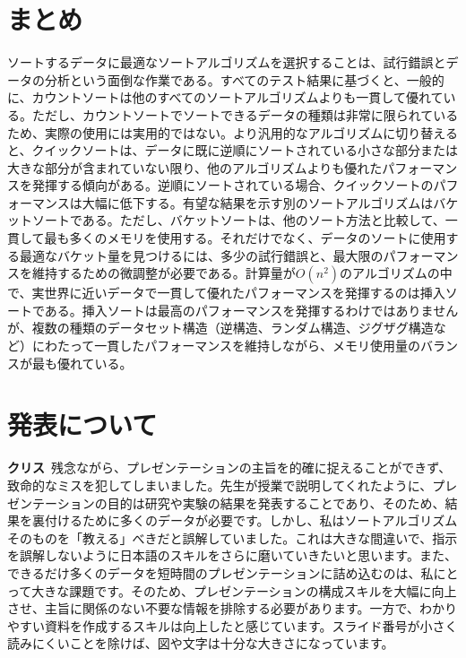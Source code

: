 \documentclass[a4j, 11pt]{jarticle}
\begin{document}
\section{まとめ}
ソートするデータに最適なソートアルゴリズムを選択することは、試行錯誤とデータの分析という面倒な作業である。すべてのテスト結果に基づくと、一般的に、カウントソートは他のすべてのソートアルゴリズムよりも一貫して優れている。ただし、カウントソートでソートできるデータの種類は非常に限られているため、実際の使用には実用的ではない。より汎用的なアルゴリズムに切り替えると、クイックソートは、データに既に逆順にソートされている小さな部分または大きな部分が含まれていない限り、他のアルゴリズムよりも優れたパフォーマンスを発揮する傾向がある。逆順にソートされている場合、クイックソートのパフォーマンスは大幅に低下する。有望な結果を示す別のソートアルゴリズムはバケットソートである。ただし、バケットソートは、他のソート方法と比較して、一貫して最も多くのメモリを使用する。それだけでなく、データのソートに使用する最適なバケット量を見つけるには、多少の試行錯誤と、最大限のパフォーマンスを維持するための微調整が必要である。計算量が$O(n^2)$のアルゴリズムの中で、実世界に近いデータで一貫して優れたパフォーマンスを発揮するのは挿入ソートである。挿入ソートは最高のパフォーマンスを発揮するわけではありませんが、複数の種類のデータセット構造（逆構造、ランダム構造、ジグザグ構造など）にわたって一貫したパフォーマンスを維持しながら、メモリ使用量のバランスが最も優れている。
\section{発表について}
\textbf{クリス}\
残念ながら、プレゼンテーションの主旨を的確に捉えることができず、致命的なミスを犯してしまいました。先生が授業で説明してくれたように、プレゼンテーションの目的は研究や実験の結果を発表することであり、そのため、結果を裏付けるために多くのデータが必要です。しかし、私はソートアルゴリズムそのものを「教える」べきだと誤解していました。これは大きな間違いで、指示を誤解しないように日本語のスキルをさらに磨いていきたいと思います。また、できるだけ多くのデータを短時間のプレゼンテーションに詰め込むのは、私にとって大きな課題です。そのため、プレゼンテーションの構成スキルを大幅に向上させ、主旨に関係のない不要な情報を排除する必要があります。一方で、わかりやすい資料を作成するスキルは向上したと感じています。スライド番号が小さく読みにくいことを除けば、図や文字は十分な大きさになっています。


\end{document}
